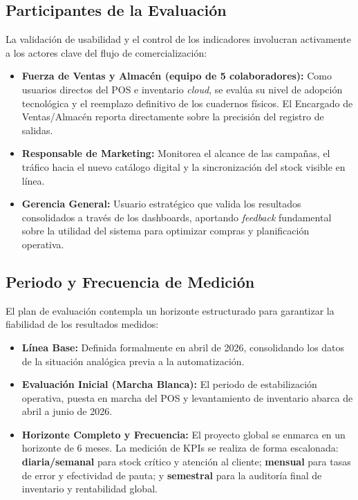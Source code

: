 \subsection{Participantes de la Evaluación}
La validación de usabilidad y el control de los indicadores involucran activamente a los actores clave del flujo de comercialización:
\begin{itemize}
    \item \textbf{Fuerza de Ventas y Almacén (equipo de 5 colaboradores):} Como usuarios directos del POS e inventario \textit{cloud}, se evalúa su nivel de adopción tecnológica y el reemplazo definitivo de los cuadernos físicos. El Encargado de Ventas/Almacén reporta directamente sobre la precisión del registro de salidas.
    \item \textbf{Responsable de Marketing:} Monitorea el alcance de las campañas, el tráfico hacia el nuevo catálogo digital y la sincronización del stock visible en línea.
    \item \textbf{Gerencia General:} Usuario estratégico que valida los resultados consolidados a través de los dashboards, aportando \textit{feedback} fundamental sobre la utilidad del sistema para optimizar compras y planificación operativa.
\end{itemize}

\subsection{Periodo y Frecuencia de Medición}
El plan de evaluación contempla un horizonte estructurado para garantizar la fiabilidad de los resultados medidos:
\begin{itemize}
    \item \textbf{Línea Base:} Definida formalmente en abril de 2026, consolidando los datos de la situación analógica previa a la automatización.
    \item \textbf{Evaluación Inicial (Marcha Blanca):} El periodo de estabilización operativa, puesta en marcha del POS y levantamiento de inventario abarca de abril a junio de 2026.
    \item \textbf{Horizonte Completo y Frecuencia:} El proyecto global se enmarca en un horizonte de 6 meses. La medición de KPIs se realiza de forma escalonada: \textbf{diaria/semanal} para stock crítico y atención al cliente; \textbf{mensual} para tasas de error y efectividad de pauta; y \textbf{semestral} para la auditoría final de inventario y rentabilidad global.
\end{itemize}
